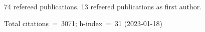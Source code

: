 74 refereed publications. 13 refeered publications as first author.

Total citations~=~3071; h-index~=~31 (2023-01-18)